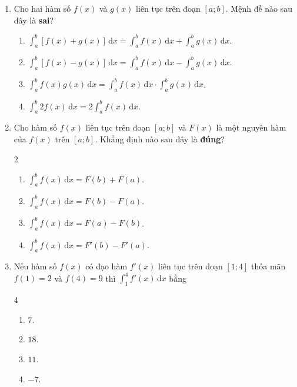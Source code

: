 \documentclass[12pt]{article}
\begin{document}
\begin{enumerate}[label=\textbf{Câu \arabic*.}]
		\item Cho hai hàm số $f(x)$ và $g(x)$ liên tục trên đoạn $[a; b]$. Mệnh đề nào sau đây là \textbf{sai}?
		\begin{enumerate}[label=\textbf{\Alph*.}]
				\item $\displaystyle \int_a^b [f(x) + g(x)]\,\mathrm{d}x = \int_a^b f(x)\,\mathrm{d}x + \int_a^b g(x)\,\mathrm{d}x$.
				\item $\displaystyle \int_a^b [f(x) - g(x)]\,\mathrm{d}x = \int_a^b f(x)\,\mathrm{d}x - \int_a^b g(x)\,\mathrm{d}x$.
				\item $\displaystyle \int_a^b f(x)g(x)\,\mathrm{d}x = \int_a^b f(x)\,\mathrm{d}x \cdot \int_a^b g(x)\,\mathrm{d}x$.
				\item $\displaystyle \int_a^b 2f(x)\,\mathrm{d}x = 2\int_a^b f(x)\,\mathrm{d}x$.
			\end{enumerate}
		
		\item Cho hàm số $f(x)$ liên tục trên đoạn $[a; b]$ và $F(x)$ là một nguyên hàm của $f(x)$ trên $[a; b]$. Khẳng định nào sau đây là \textbf{đúng}?
		\begin{multicols}{2}
			\begin{enumerate}[label=\textbf{\Alph*.}]
				\item $\displaystyle \int_a^b f(x)\,\mathrm{d}x = F(b) + F(a)$.
				\item $\displaystyle \int_a^b f(x)\,\mathrm{d}x = F(b) - F(a)$.
				\item $\displaystyle \int_a^b f(x)\,\mathrm{d}x = F(a) - F(b)$.
				\item $\displaystyle \int_a^b f(x)\,\mathrm{d}x = F'(b) - F'(a)$.
			\end{enumerate}
		\end{multicols}
		
		\item Nếu hàm số $f(x)$ có đạo hàm $f'(x)$ liên tục trên đoạn $[1; 4]$ thỏa mãn $f(1) = 2$ và $f(4) = 9$ thì $\displaystyle \int_1^4 f'(x)\,\mathrm{d}x$ bằng
		\begin{multicols}{4}
			\begin{enumerate}[label=\textbf{\Alph*.}]
				\item $7$.
				\item $18$.
				\item $11$.
				\item $-7$.
			\end{enumerate}
		\end{multicols}
		

\end{enumerate}
\end{document}
